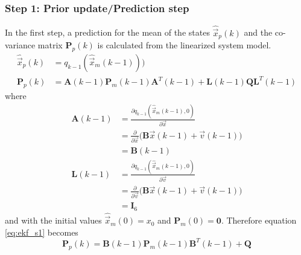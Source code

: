 \subsubsection{Step 1: Prior update/Prediction step}
In the first step, a prediction for the mean of the states $\hat{\vec x}_p(k)$ and the co-variance matrix $\textbf{P}_p(k)$ is calculated from the linearized system model.
\begin{align}
  \hat{\vec x}_p(k) &=  q_{k-1}(\hat{\vec x}_m(k-1)))\\
	\textbf{P}_p(k) &= {\textbf{A}}(k-1) \textbf{P}_m(k-1) {\textbf{A}}^T(k-1) + \textbf{L}(k-1) \textbf{Q} \textbf{L}^T(k-1) \label{eq:ekf_s1}
\end{align}
where
\begin{align}
  \textbf{A}(k-1) & = \frac{\partial q_{k-1}(\hat{\vec x}_m(k-1), 0)}{\partial \vec x}\\
  & =  \frac{\partial}{\partial \vec x} \big(\textbf{B} \vec x(k-1) + \vec v(k-1)\big)\\
	& = \textbf{B}(k-1)\\
  \textbf{L}(k-1) & = \frac{\partial q_{k-1}(\hat{\vec x}_m(k-1), 0)}{\partial \vec v}\\
  & = \frac{\partial}{\partial \vec v} \big( \textbf{B} \vec x(k-1) + \vec v(k-1)\big)\\
	& = \textbf{I}_6
\end{align}
and with the initial values $\hat{\vec x}_m(0) = x_0$ and $\textbf{P}_m(0) = \textbf{0}$.
Therefore equation \ref{eq:ekf_s1} becomes
$$\textbf{P}_p(k) = \textbf{B}(k-1)\textbf{P}_m(k-1)\textbf{B}^{T}(k-1) + \textbf{Q}$$

